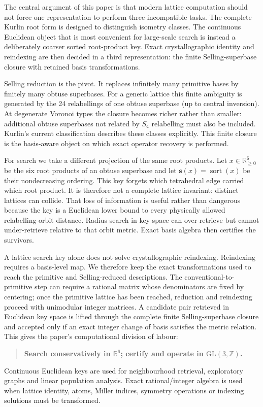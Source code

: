 \documentclass[11pt]{article}
\newcommand{\sortkey}{\mathbf{s}}
\begin{document}
The central argument of this paper is that modern lattice computation should not force one representation to perform three incompatible tasks. The complete Kurlin root form is designed to distinguish isometry classes. The continuous Euclidean object that is most convenient for large-scale search is instead a deliberately coarser sorted root-product key. Exact crystallographic identity and reindexing are then decided in a third representation: the finite Selling-superbase closure with retained basis transformations.

Selling reduction is the pivot. It replaces infinitely many primitive bases by finitely many obtuse superbases. For a generic lattice this finite ambiguity is generated by the 24 relabellings of one obtuse superbase (up to central inversion). At degenerate Voronoi types the closure becomes richer rather than smaller: additional obtuse superbases not related by $S_4$ relabelling must also be included. Kurlin's current classification describes these classes explicitly. This finite closure is the basis-aware object on which exact operator recovery is performed.

For search we take a different projection of the same root products. Let $x\in\mathbb R_{\ge0}^6$ be the six root products of an obtuse superbase and let $\sortkey(x)=\operatorname{sort}(x)$ be their nondecreasing ordering. This key forgets which tetrahedral edge carried which root product. It is therefore not a complete lattice invariant: distinct lattices can collide. That loss of information is useful rather than dangerous because the key is a Euclidean lower bound to every physically allowed relabelling-orbit distance. Radius search in key space can over-retrieve but cannot under-retrieve relative to that orbit metric. Exact basis algebra then certifies the survivors.

A lattice search key alone does not solve crystallographic reindexing. Reindexing requires a basis-level map. We therefore keep the exact transformations used to reach the primitive and Selling-reduced descriptions. The conventional-to-primitive step can require a rational matrix whose denominators are fixed by centering; once the primitive lattice has been reached, reduction and reindexing proceed with unimodular integer matrices. A candidate pair retrieved in Euclidean key space is lifted through the complete finite Selling-superbase closure and accepted only if an exact integer change of basis satisfies the metric relation. This gives the paper's computational division of labour:
\begin{quote}
\textbf{Search conservatively in $\mathbb R^6$; certify and operate in $\mathrm{GL}(3,\mathbb Z)$.}
\end{quote}
Continuous Euclidean keys are used for neighbourhood retrieval, exploratory graphs and linear population analysis. Exact rational/integer algebra is used when lattice identity, atoms, Miller indices, symmetry operations or indexing solutions must be transformed.
\end{document}
